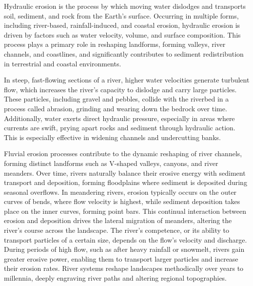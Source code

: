 Hydraulic erosion is the process by which moving water dislodges and transports soil, sediment, and rock from the Earth's surface. Occurring in multiple forms, including river-based, rainfall-induced, and coastal erosion, hydraulic erosion is driven by factors such as water velocity, volume, and surface composition. This process plays a primary role in reshaping landforms, forming valleys, river channels, and coastlines, and significantly contributes to sediment redistribution in terrestrial and coastal environments.


In steep, fast-flowing sections of a river, higher water velocities generate turbulent flow, which increases the river's capacity to dislodge and carry large particles. These particles, including gravel and pebbles, collide with the riverbed in a process called abrasion, grinding and wearing down the bedrock over time. Additionally, water exerts direct hydraulic pressure, especially in areas where currents are swift, prying apart rocks and sediment through hydraulic action. This is especially effective in widening channels and undercutting banks.

Fluvial erosion processes contribute to the dynamic reshaping of river channels, forming distinct landforms such as V-shaped valleys, canyons, and river meanders. Over time, rivers naturally balance their erosive energy with sediment transport and deposition, forming floodplains where sediment is deposited during seasonal overflows. In meandering rivers, erosion typically occurs on the outer curves of bends, where flow velocity is highest, while sediment deposition takes place on the inner curves, forming point bars. This continual interaction between erosion and deposition drives the lateral migration of meanders, altering the river's course across the landscape. The river's competence, or its ability to transport particles of a certain size, depends on the flow's velocity and discharge. During periods of high flow, such as after heavy rainfall or snowmelt, rivers gain greater erosive power, enabling them to transport larger particles and increase their erosion rates. River systems reshape landscapes methodically over years to millennia, deeply engraving river paths and altering regional topographies.



